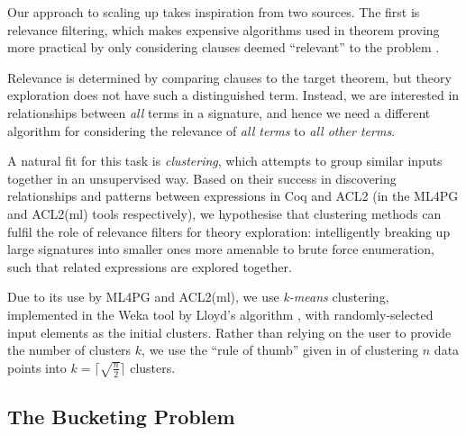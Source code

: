 Our approach to scaling up \qspec{} takes inspiration from two sources. The
first is relevance filtering, which makes expensive algorithms used in theorem
proving more practical by only considering clauses deemed ``relevant'' to the
problem \cite{meng2009lightweight}.

Relevance is determined by comparing clauses to the target theorem, but theory
exploration does not have such a distinguished term. Instead, we are interested
in relationships between \emph{all} terms in a signature, and hence we need a
different algorithm for considering the relevance of \emph{all terms} to
\emph{all other terms}.

A natural fit for this task is \emph{clustering}, which attempts to group
similar inputs together in an unsupervised way. Based on their success in
discovering relationships and patterns between expressions in Coq and ACL2 (in
the ML4PG and ACL2(ml) tools respectively), we hypothesise that clustering
methods can fulfil the role of relevance filters for theory exploration:
intelligently breaking up large signatures into smaller ones more amenable to
brute force enumeration, such that related expressions are explored together.

Due to its use by ML4PG and ACL2(ml), we use \emph{k-means} clustering,
implemented in the Weka tool \cite{Holmes.Donkin.Witten:1994} by Lloyd's
algorithm \cite{lloyd1982least}, with randomly-selected input elements as the
initial clusters. Rather than relying on the user to provide the number of
clusters $k$, we use the ``rule of thumb'' given in
\cite[pp. 365]{mardia1979multivariate} of clustering $n$ data points into
$k = \lceil \sqrt{\frac{n}{2}} \rceil$ clusters.

\subsection{The Bucketing Problem}
\label{sec:bucketing}

